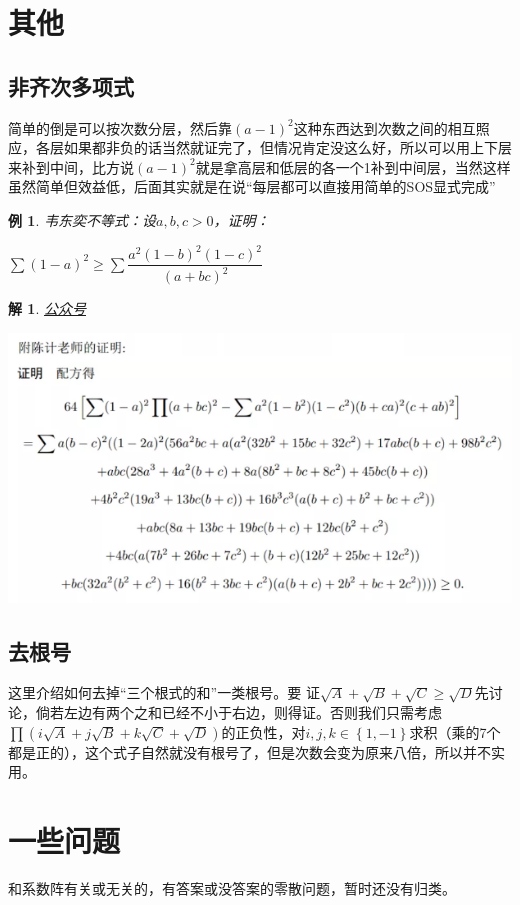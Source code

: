 \documentclass[UTF8]{ctexart}
\newtheorem{1}{例}
\newtheorem{2}{解}
\begin{document}
\section{其他}
\subsection{非齐次多项式}
简单的倒是可以按次数分层，然后靠$ (a-1)^{2} $这种东西达到次数之间的相互照应，各层如果都非负的话当然就证完了，但情况肯定没这么好，所以可以用上下层来补到中间，比方说$ (a-1)^{2} $就是拿高层和低层的各一个1补到中间层，当然这样虽然简单但效益低，后面其实就是在说“每层都可以直接用简单的SOS显式完成”
\begin{1}
	韦东奕不等式：设$ a,b,c> 0 $，证明：\\
	\begin{center}
		$ \displaystyle \sum (1-a)^{2}\geq \displaystyle \sum \dfrac{a^{2}(1-b)^{2}(1-c)^{2}}{(a+bc)^{2}} $
	\end{center}
\end{1}
\begin{2}
	\href{https://mp.weixin.qq.com/s/HswqcHJEWK8s-WV68PIqog}{公众号}
	\begin{center}
		\includegraphics[width=0.8\linewidth]{46}
	\end{center}
\end{2}
\subsection{去根号}
这里介绍如何去掉“三个根式的和”一类根号。要
证$ \sqrt{A}+\sqrt{B}+\sqrt{C}\ge \sqrt{D} $先讨论，倘若左边有两个之和已经不小于右边，则得证。否则我们只需考虑$ \prod (i\sqrt{A}+j\sqrt{B}+k\sqrt{C}+\sqrt{D}) $的正负性，对$ i,j,k\in \left \{ 1,-1 \right \}  $求积（乘的7个都是正的），这个式子自然就没有根号了，但是次数会变为原来八倍，所以并不实用。
\section{一些问题}
和系数阵有关或无关的，有答案或没答案的零散问题，暂时还没有归类。
\end{document}
